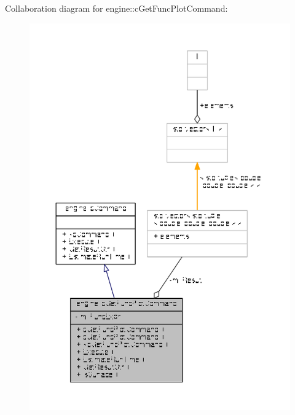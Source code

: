 Collaboration diagram for engine\-:\-:c\-Get\-Func\-Plot\-Command\-:
\nopagebreak
\begin{figure}[H]
\begin{center}
\leavevmode
\includegraphics[width=350pt]{classengine_1_1cGetFuncPlotCommand__coll__graph}
\end{center}
\end{figure}
